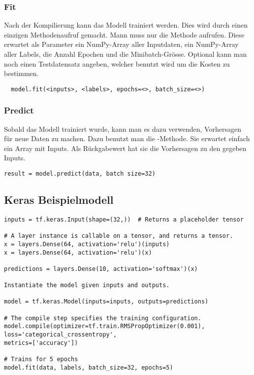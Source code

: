 \subsubsection{Fit}
Nach der Kompilierung kann das Modell trainiert werden. Dies wird durch einen
einzigen Methodenaufruf gemacht. Mann muss nur die  Methode aufrufen.
Diese erwartet als Parameter ein NumPy-Array aller Inputdaten, ein NumPy-Array
aller Labels, die Anzahl Epochen und die Minibatch-Grösse.
Optional kann man noch einen Testdatensatz angeben, welcher benutzt wird um die
Kosten zu bestimmen.
\begin{verbatim}
  model.fit(<inputs>, <labels>, epochs=<>, batch_size=<>)
\end{verbatim}

\subsubsection{Predict}
Sobald das Modell trainiert wurde, kann man es dazu verwenden, Vorhersagen für
neue Daten zu machen. Dazu benutzt man die -Methode. Sie erwartet
einfach ein Array mit Inputs. Als Rückgabewert hat sie die Vorhersagen zu den
gegeben Inputs.

\begin{verbatim}
result = model.predict(data, batch size=32)
\end{verbatim}

\subsection{Keras Beispielmodell}

\begin{verbatim}
inputs = tf.keras.Input(shape=(32,))  # Returns a placeholder tensor

# A layer instance is callable on a tensor, and returns a tensor.
x = layers.Dense(64, activation='relu')(inputs)
x = layers.Dense(64, activation='relu')(x)

predictions = layers.Dense(10, activation='softmax')(x)

Instantiate the model given inputs and outputs.

model = tf.keras.Model(inputs=inputs, outputs=predictions)

# The compile step specifies the training configuration.
model.compile(optimizer=tf.train.RMSPropOptimizer(0.001),
loss='categorical_crossentropy',
metrics=['accuracy'])

# Trains for 5 epochs
model.fit(data, labels, batch_size=32, epochs=5)
\end{verbatim}


